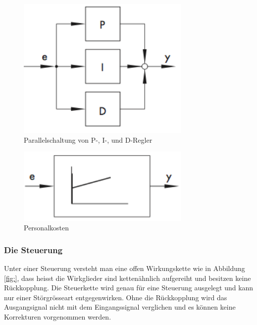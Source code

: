\begin{figure}[h!, width=\pagewidth]
\begin{center}
\includegraphics[width=0.75\textwidth]{images/PRDRegler1}
\caption{Parallelschaltung von P-, I-, und D-Regler}
\label{fig:PRDRegler1}
\end{center}
\end{figure}

\begin{figure}[h!, width=\pagewidth]
\begin{center}
\includegraphics[width=0.75\textwidth]{images/PIDRegler2}
\caption{Personalkosten}
\label{fig:PIDRegler2}
\end{center}
\end{figure}


\subsubsection{Die Steuerung}

Unter einer Steuerung versteht man eine offen Wirkungskette wie in Abbildung \ref{fig:}, dass heisst die Wirkglieder sind kettenähnlich aufgereiht und besitzen keine Rückkopplung. Die Steuerkette wird genau für eine Steuerung ausgelegt und kann nur einer Störgrösseart entgegenwirken. Ohne die Rückkopplung wird das Ausgangsignal nicht mit dem Eingangssignal verglichen und es können keine Korrekturen vorgenommen werden.

